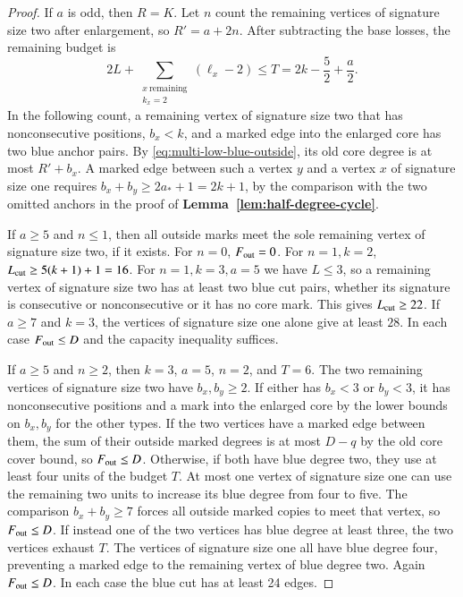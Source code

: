 \begin{proof}
If $a$ is odd, then $R=K$. Let $n$ count the remaining vertices
of signature size two after enlargement, so $R'=a+2n$. After
subtracting the base losses, the remaining budget is
\begin{equation}\label{eq:multi-small-odd-budget}
 2L+\sum_{\substack{x\ \text{remaining}\\ k_x=2}}(\ell_x-2)
 \le T=2k-\frac{5}{2}+\frac{a}{2} .
\end{equation}
In the following count, a remaining vertex of signature size two
that has nonconsecutive positions, $b_x<k$, and a marked edge
into the enlarged core has two blue anchor pairs. By
\eqref{eq:multi-low-blue-outside}, its old core degree is at
most $R'+b_x$. A marked edge between such a vertex $y$ and a
vertex $x$ of signature size one requires
$b_x+b_y\ge2a_*+1=2k+1$, by the comparison with the two
omitted anchors in the proof of \textbf{Lemma~\ref{lem:half-degree-cycle}}.

If $a\ge5$ and $n\le1$, then all outside marks meet the sole
remaining vertex of signature size two, if it exists. For $n=0$,
$F_{\rm out}=0$. For $n=1,k=2$, $L_{\rm cut}\ge5(k+1)+1=16$.
For $n=1,k=3,a=5$ we have $L\le3$, so a remaining vertex
of signature size two has at least two blue cut pairs, whether
its signature is consecutive or nonconsecutive or it has no
core mark. This gives $L_{\rm cut}\ge22$. If $a\ge7$ and
$k=3$, the vertices of signature size one alone give at least
$28$. In each case $F_{\rm out}\le D$ and the capacity inequality suffices.

If $a\ge5$ and $n\ge2$, then $k=3$, $a=5$, $n=2$, and
$T=6$. The two remaining vertices of signature size two have
$b_x,b_y\ge2$. If either has $b_x<3$ or $b_y<3$, it has
nonconsecutive positions and a mark into the enlarged core by
the lower bounds on $b_x,b_y$ for the other types. If the two
vertices have a marked edge between them, the sum of their
outside marked degrees is at most $D-q$ by the old core cover
bound, so $F_{\rm out}\le D$. Otherwise, if both have blue degree two,
they use at least four units of the budget $T$. At most one
vertex of signature size one can use the remaining two units
to increase its blue degree from four to five. The comparison
$b_x+b_y\ge7$ forces all outside marked copies to meet that
vertex, so $F_{\rm out}\le D$. If instead one of the two vertices has
blue degree at least three, the two vertices exhaust $T$.
The vertices of signature size one all have blue degree four,
preventing a marked edge to the remaining vertex of blue
degree two. Again $F_{\rm out}\le D$. In each case the blue cut has at
least 24 edges.


\end{proof}

